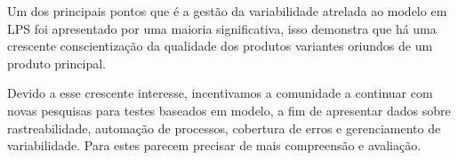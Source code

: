 Um dos principais pontos que é a gestão da variabilidade atrelada ao modelo em LPS foi apresentado por uma maioria significativa, isso demonstra que há uma crescente conscientização da qualidade dos produtos variantes oriundos de um produto principal.

Devido a esse crescente interesse, incentivamos a comunidade a continuar com novas pesquisas para testes baseados em modelo, a fim de apresentar dados sobre rastreabilidade, automação de processos, cobertura de erros e gerenciamento de variabilidade. Para estes parecem precisar de mais compreensão e avaliação.